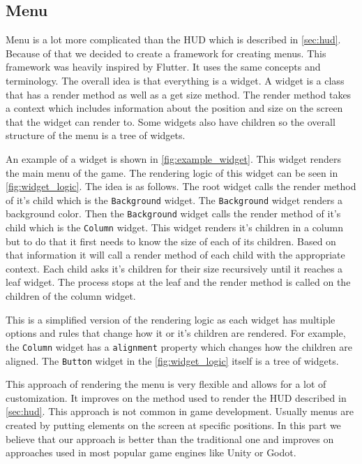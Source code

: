 \subsection{Menu} \label{sec:menu}
Menu is a lot more complicated than the HUD which is described in \autoref*{sec:hud}.
Because of that we decided to create a framework for creating menus.
This framework was heavily inspired by Flutter.
It uses the same concepts and terminology.
The overall idea is that everything is a widget.
A widget is a class that has a render method as well as a get size method.
The render method takes a context which includes information about the position and size on the screen that the widget can render to.
Some widgets also have children so the overall structure of the menu is a tree of widgets.

An example of a widget is shown in \autoref*{fig:example_widget}.
This widget renders the main menu of the game.
The rendering logic of this widget can be seen in \autoref*{fig:widget_logic}.
The idea is as follows.
The root widget calls the render method of it's child which is the \texttt{Background} widget.
The \texttt{Background} widget renders a background color.
Then the \texttt{Background} widget calls the render method of it's child which is the \texttt{Column} widget.
This widget renders it's children in a column but to do that it first needs to know the size of each of its children.
Based on that information it will call a render method of each child with the appropriate context.
Each child asks it's children for their size recursively until it reaches a leaf widget.
The process stops at the leaf and the render method is called on the children of the column widget.

This is a simplified version of the rendering logic as each widget has multiple options and rules that change how it or it's children are rendered.
For example, the \texttt{Column} widget has a \texttt{alignment} property which changes how the children are aligned.
The \texttt{Button} widget in the \autoref*{fig:widget_logic} itself is a tree of widgets.

This approach of rendering the menu is very flexible and allows for a lot of customization.
It improves on the method used to render the HUD described in \autoref*{sec:hud}.
This approach is not common in game development.
Usually menus are created by putting elements on the screen at specific positions. %
In this part we believe that our approach is better than the traditional one and improves on approaches used in most popular game engines like Unity or Godot.

